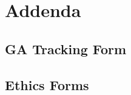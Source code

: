 \chapter{Addenda}
\label{ch_addenda}

\newpage

\begin{minipage}{\linewidth}
\section{GA Tracking Form}

\end{minipage}

\newpage

\begin{minipage}{\linewidth}
	\section{Ethics Forms}
	
\end{minipage}
